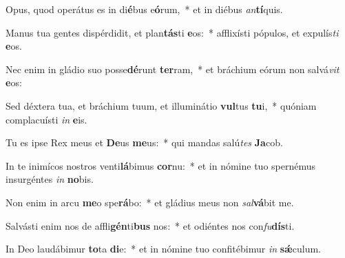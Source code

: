 \item Opus, quod operátus es in di\textbf{é}bus e\textbf{ó}rum,~* et in diébus \textit{an}\textbf{tí}quis.
\item Manus tua gentes dispérdidit, et plan\textbf{tás}ti \textbf{e}os:~* afflixísti pópulos, et expulís\textit{ti} \textbf{e}os.
\item Nec enim in gládio suo posse\textbf{dé}runt \textbf{ter}ram,~* et bráchium eórum non salvá\textit{vit} \textbf{e}os:
\item Sed déxtera tua, et bráchium tuum, et illuminátio \textbf{vul}tus \textbf{tu}i,~* quóniam complacuísti \textit{in} \textbf{e}is.
\item Tu es ipse Rex meus et \textbf{De}us \textbf{me}us:~* qui mandas salú\textit{tes} \textbf{Ja}cob.
\item In te inimícos nostros venti\textbf{lá}bimus \textbf{cor}nu:~* et in nómine tuo spernémus insurgéntes \textit{in} \textbf{no}bis.
\item Non enim in arcu \textbf{me}o spe\textbf{rá}bo:~* et gládius meus non \textit{sal}\textbf{vá}bit me.
\item Salvásti enim nos de affli\textbf{gén}ti\textbf{bus} nos:~* et odiéntes nos con\textit{fu}\textbf{dís}ti.
\item In Deo laudábimur \textbf{to}ta \textbf{di}e:~* et in nómine tuo confitébimur \textit{in} \textbf{sǽ}culum.
